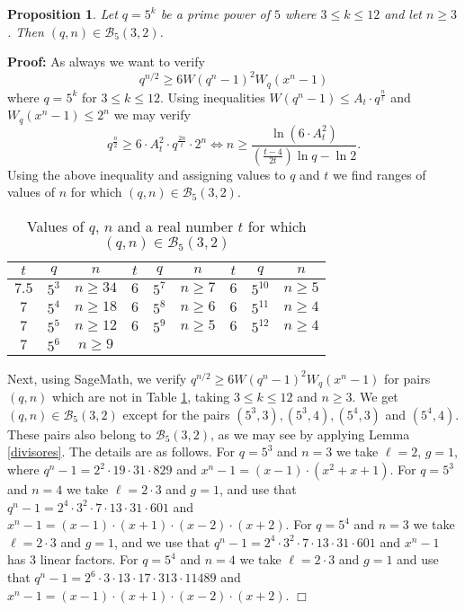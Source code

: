\documentclass[12pt]{article}
\newtheorem{proposition}[theorem]{Proposition}
\newenvironment{proof}{\noindent \textbf{Proof: }}{\hfill
$\Box$  \vspace{1ex}}
\begin{document}
\begin{proposition}\label{case5_4}
Let $q=5^k$ be a prime power of $5$ where
$3 \leq k \leq 12$
and let $n\geq 3$. Then $(q,n) \in \mathcal{B}_5(3,2)$.
\end{proposition}
\begin{proof}
As always we want to verify 
$$
q^{n/2} \geq 6 W(q^{n}-1)^2 W_q(x^n-1)
$$
where $q=5^k$ for $3 \leq k \leq 12$. Using inequalities
$W(q^{n}-1) \leq A_t \cdot q^{\frac{n}{t}}$ and 
$W_q(x^n-1)\leq 2^n$ we may verify
$$
q^{\frac{n}{2}} \geq 6 \cdot A_t^2 \cdot q^{\frac{2n}{t}} \cdot  2^{n}
\Longleftrightarrow
n \geq \frac{\ln (6 \cdot A_t^2)}{ \left( \frac{t-4}{2t} \right)\ln q -\ln  2}.
$$
Using the above inequality and assigning values to $q$ and $t$ we find ranges 
of values of
$n$ for which $(q,n) \in \mathcal{B}_5(3,2)$. %
\begin{table}[h]
	\centering
	\begin{tabular}{ccc|ccc|ccc}
		$t$ & $q$ & $n$ & $t$  &$q$ & $n$ & $t$  &$q$ & $n$ \\
		\hline
		$7.5$ & $5^3$  & $n \geq 34$ & $6$& $5^7$ & $n \geq 7$  & $6$ & 
		$5^{10}$ 
		                                                       & $n \geq 5$ \\
		$7$ & $5^4$  & $n \geq 18$ & $6$ & $5^8$ & $n \geq 6$& $6$ & $5^{11}$
		& $n \geq 4$ \\
		$7$ & $5^5$  & $n \geq 12$ & $6$ & $5^9$ & $n \geq 5$  & $6$ & $5^{12}$
		& $n \geq 4$ \\
		$7$ & $5^6$ & $n \geq 9$ 
	\end{tabular}
	\caption{Values of $q$, $n$ and a real number $t$ for which
		$(q,n)\in \mathcal{B}_5(3,2)$}
	\label{Case5_1}
\end{table}

Next, using SageMath,
we verify $q^{n/2} \geq 6 W(q^{n}-1)^2 W_q(x^n-1)$  for
pairs $(q,n)$ which are not in Table \ref{Case5_1}, taking $3 \leq k \leq 12$
and $n \geq 3$.
We get $(q,n) \in \mathcal{B}_5(3,2)$ except
for the pairs $(5^3,3),(5^3,4),(5^4,3)$ and $(5^4,4)$. These
pairs also belong to $\mathcal{B}_5(3,2)$, as we may see by applying 
Lemma \ref{divisores}. The details are as follows. For $q=5^3$ and $n=3$ we take
$\ell=2$, $g=1$,
where $q^n-1=2^2 \cdot 19 \cdot 31 \cdot 829$ and
$x^n-1=(x - 1) \cdot (x^2 + x + 1)$.
For $q=5^3$ and $n=4$ we take $\ell=2 \cdot 3$ and $g=1$,
and use that $q^n-1=2^4 \cdot 3^2 \cdot 7 \cdot 13 \cdot 31 \cdot 601$ and
$x^n-1=(x - 1) \cdot (x+1) \cdot (x-2) \cdot (x+2)$.
For $q=5^4$ and $n=3$ we take $\ell=2\cdot 3$ and $g=1$,
and we use that  $q^n-1=2^4 \cdot 3^2 \cdot 7 \cdot 13 \cdot 31 \cdot 601$ and
$x^n-1$ has $3$ linear factors.
For $q=5^4$ and $n=4$ we take $\ell=2 \cdot 3$ and $g=1$ and use that 
 $q^n-1=2^6 \cdot 3 \cdot 13 \cdot 17 \cdot 313 \cdot 11489$ and
$x^n-1=(x - 1) \cdot (x+1) \cdot (x-2) \cdot (x+2)$.
\end{proof}
\end{document}
